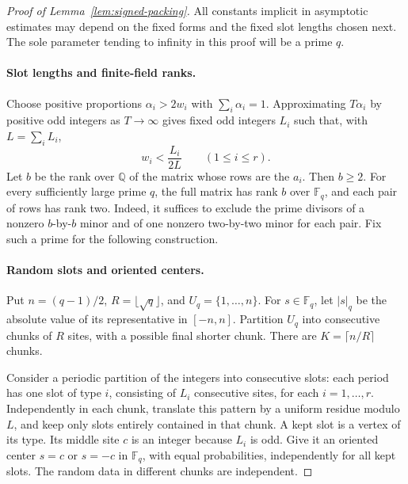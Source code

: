 \begin{proof}[Proof of Lemma~\ref{lem:signed-packing}]
All constants implicit in asymptotic estimates may depend on the fixed
forms and the fixed slot lengths chosen next.  The sole parameter tending
to infinity in this proof will be a prime $q$.

\paragraph{Slot lengths and finite-field ranks.}
Choose positive proportions $\alpha_i>2w_i$ with $\sum_i\alpha_i=1$.
Approximating $T\alpha_i$ by positive odd integers as $T\to\infty$
gives fixed odd integers $L_i$ such that, with $L=\sum_iL_i$,
\begin{equation}
 w_i<\frac{L_i}{2L}\qquad(1\le i\le r).
 \label{eq:packing-width-slack}
\end{equation}
Let $b$ be the rank over $\mathbb Q$ of the matrix whose rows are the $a_i$.
Then $b\ge2$.  For every sufficiently large prime $q$, the full matrix
has rank $b$ over $\mathbb F_q$, and each pair of rows has rank two.
Indeed, it suffices to exclude the prime divisors of a nonzero
$b$-by-$b$ minor and of one nonzero two-by-two minor for each pair.
Fix such a prime for the following construction.

\paragraph{Random slots and oriented centers.}
Put $n=(q-1)/2$, $R=\lfloor\sqrt q\rfloor$, and
$U_q=\{1,\ldots,n\}$.  For $s\in\mathbb F_q$, let $|s|_q$
be the absolute value of its representative in $[-n,n]$.
Partition $U_q$ into consecutive chunks of $R$ sites, with a possible
final shorter chunk.  There are $K=\lceil n/R\rceil$ chunks.

Consider a periodic partition of the integers into consecutive slots:
each period has one slot of type $i$, consisting of $L_i$ consecutive
sites, for each $i=1,\ldots,r$.  Independently in each chunk, translate
this pattern by a uniform residue modulo $L$, and keep only slots
entirely contained in that chunk.  A kept slot is a vertex of its type.
Its middle site $c$ is an integer because $L_i$ is odd.  Give it an
oriented center $s=c$ or $s=-c$ in $\mathbb F_q$, with equal probabilities,
independently for all kept slots.  The random data in different chunks
are independent.


\end{proof}
